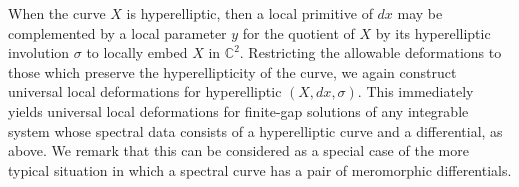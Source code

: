 \documentclass[11pt,twoside]{amsart}
\theoremstyle{plain}
\newcommand{\C}{\mathbb{C}}
\newcommand{\dfx}{dx}
\begin{document}
When the curve $ X $ is hyperelliptic, %
then a local primitive of $ dx $ may be complemented by %
a local parameter $ y $ for the quotient of $ X $ by its hyperelliptic involution $\sigma $ to locally embed $X $  in $\C ^2 $. Restricting the allowable deformations to those which preserve the hyperellipticity of the curve, we again construct  universal local deformations for hyperelliptic $ (X,\dfx,\sigma) $.  This immediately yields universal local deformations for finite-gap solutions of any integrable system whose spectral data consists of a hyperelliptic curve and a differential, as above. We remark that this can be considered as a special case of the more typical situation in which a spectral curve has a pair of meromorphic differentials.

\end{document}
